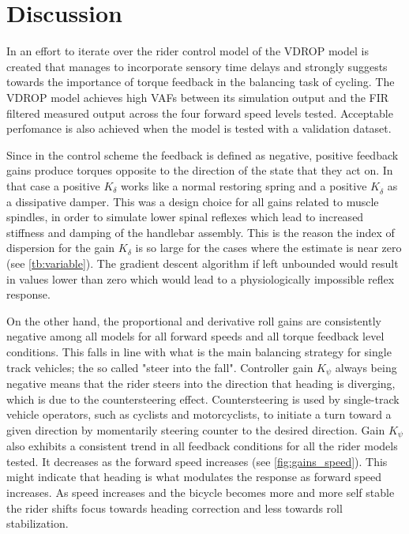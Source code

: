 \section{Discussion}
In an effort to iterate over the rider control model of \citet{schwab2013} the VDROP model is created that manages to incorporate sensory time delays and strongly suggests towards the importance of torque feedback in the balancing task of cycling.  The VDROP model achieves high VAFs between its simulation output and the FIR filtered measured output across the four forward speed levels tested. Acceptable perfomance is also achieved when the model is tested with a validation dataset. 

Since in the control scheme the feedback is defined as negative, positive feedback gains produce torques opposite to the direction of the state that they act on. In that case a  positive \ensuremath{K_\delta} works like a normal restoring spring and  a positive \ensuremath{K_{\dot{\delta}}} as a dissipative damper. This was a design choice for all gains related to muscle spindles, in order to simulate lower spinal reflexes which  lead to increased stiffness and damping of the handlebar assembly. This is the reason the index of dispersion for the gain \ensuremath{K_\delta} is so large for the cases where the estimate is near zero (see \cref{tb:variable}). The gradient descent algorithm if left unbounded would result in values lower than zero which would lead to a physiologically impossible reflex response.  

On the other hand, the proportional and derivative roll gains  are consistently negative among all models for all forward speeds and all torque feedback level conditions. This falls in line with what is the main balancing strategy for single track vehicles; the so called "steer into the fall". Controller gain \ensuremath{K_\psi} always being negative means that the rider steers into the direction that heading is diverging, which  is due to the countersteering effect. Countersteering is used by single-track vehicle operators, such as cyclists and motorcyclists, to initiate a turn toward a given direction by momentarily steering counter to the desired direction. Gain \ensuremath{K_\psi} also exhibits a  consistent trend in all feedback conditions for all the rider models tested. It decreases as the forward speed increases (see \cref{fig:gains_speed}). This might indicate that heading is what modulates the response as forward speed increases. As  speed increases and the bicycle becomes more and more self stable the rider shifts focus towards heading correction and less towards roll stabilization. 

